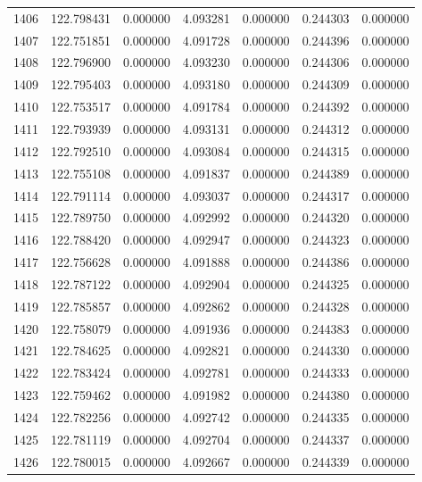 \begin{tabular}{rrrrrrr}
1406 & 122.798431 &    0.000000 &  4.093281 &    0.000000 &    0.244303 &  0.000000 \\
1407 & 122.751851 &    0.000000 &  4.091728 &    0.000000 &    0.244396 &  0.000000 \\
1408 & 122.796900 &    0.000000 &  4.093230 &    0.000000 &    0.244306 &  0.000000 \\
1409 & 122.795403 &    0.000000 &  4.093180 &    0.000000 &    0.244309 &  0.000000 \\
1410 & 122.753517 &    0.000000 &  4.091784 &    0.000000 &    0.244392 &  0.000000 \\
1411 & 122.793939 &    0.000000 &  4.093131 &    0.000000 &    0.244312 &  0.000000 \\
1412 & 122.792510 &    0.000000 &  4.093084 &    0.000000 &    0.244315 &  0.000000 \\
1413 & 122.755108 &    0.000000 &  4.091837 &    0.000000 &    0.244389 &  0.000000 \\
1414 & 122.791114 &    0.000000 &  4.093037 &    0.000000 &    0.244317 &  0.000000 \\
1415 & 122.789750 &    0.000000 &  4.092992 &    0.000000 &    0.244320 &  0.000000 \\
1416 & 122.788420 &    0.000000 &  4.092947 &    0.000000 &    0.244323 &  0.000000 \\
1417 & 122.756628 &    0.000000 &  4.091888 &    0.000000 &    0.244386 &  0.000000 \\
1418 & 122.787122 &    0.000000 &  4.092904 &    0.000000 &    0.244325 &  0.000000 \\
1419 & 122.785857 &    0.000000 &  4.092862 &    0.000000 &    0.244328 &  0.000000 \\
1420 & 122.758079 &    0.000000 &  4.091936 &    0.000000 &    0.244383 &  0.000000 \\
1421 & 122.784625 &    0.000000 &  4.092821 &    0.000000 &    0.244330 &  0.000000 \\
1422 & 122.783424 &    0.000000 &  4.092781 &    0.000000 &    0.244333 &  0.000000 \\
1423 & 122.759462 &    0.000000 &  4.091982 &    0.000000 &    0.244380 &  0.000000 \\
1424 & 122.782256 &    0.000000 &  4.092742 &    0.000000 &    0.244335 &  0.000000 \\
1425 & 122.781119 &    0.000000 &  4.092704 &    0.000000 &    0.244337 &  0.000000 \\
1426 & 122.780015 &    0.000000 &  4.092667 &    0.000000 &    0.244339 &  0.000000 \\

\end{tabular}
